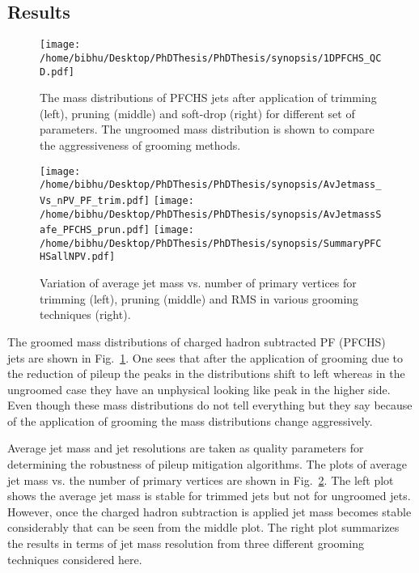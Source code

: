 \subsection{Results}

\begin{figure}[h]
\centering
\texttt{[image: /home/bibhu/Desktop/PhDThesis/PhDThesis/synopsis/1DPFCHS\_QCD.pdf]}

\caption{\label{fig:grooming1D} The mass distributions of PFCHS jets after application of trimming (left), pruning (middle) and soft-drop (right) for different set of parameters. The ungroomed mass distribution is shown to compare the aggressiveness of grooming methods. }
\end{figure}

\begin{figure}[h]
\centering
\texttt{[image: /home/bibhu/Desktop/PhDThesis/PhDThesis/synopsis/AvJetmass\_Vs\_nPV\_PF\_trim.pdf]}
\texttt{[image: /home/bibhu/Desktop/PhDThesis/PhDThesis/synopsis/AvJetmassSafe\_PFCHS\_prun.pdf]}
\texttt{[image: /home/bibhu/Desktop/PhDThesis/PhDThesis/synopsis/SummaryPFCHSallNPV.pdf]}
\caption{\label{fig:Groom}Variation of average jet mass vs. number of primary vertices for trimming (left), pruning (middle) and RMS in various grooming techniques (right).  }
\end{figure}

The groomed mass distributions of charged hadron subtracted PF (PFCHS) ~\cite{Beaudette:2014cea, JMEPAS} jets are shown in Fig.~\ref{fig:grooming1D}. One sees that after the application of grooming due to the reduction of pileup the peaks in the distributions shift to left whereas in the ungroomed case they have an unphysical looking like peak in the higher side. Even though these mass distributions do not tell everything but they say because of the application of grooming the mass distributions change aggressively.  

Average jet mass and jet resolutions are taken as quality parameters for determining the robustness of pileup mitigation algorithms. The plots of average jet mass vs. the number of primary vertices are shown in Fig.~\ref{fig:Groom}. The left plot shows the average jet mass is stable for trimmed jets but not for ungroomed jets. However, once the charged hadron subtraction is applied jet mass becomes stable considerably that can be seen from the middle plot. The right plot summarizes the results in terms of jet mass resolution from three different grooming techniques considered here.


